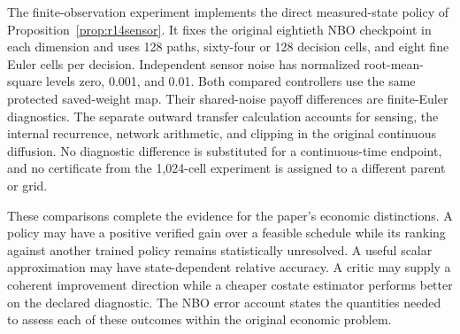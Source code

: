 


The finite-observation experiment implements the direct measured-state policy of Proposition~\ref{prop:r14sensor}. It fixes the original eightieth NBO checkpoint in each dimension and uses 128 paths, sixty-four or 128 decision cells, and eight fine Euler cells per decision. Independent sensor noise has normalized root-mean-square levels zero, 0.001, and 0.01. Both compared controllers use the same protected saved-weight map. Their shared-noise payoff differences are finite-Euler diagnostics. The separate outward transfer calculation accounts for sensing, the internal recurrence, network arithmetic, and clipping in the original continuous diffusion. No diagnostic difference is substituted for a continuous-time endpoint, and no certificate from the 1,024-cell experiment is assigned to a different parent or grid.

These comparisons complete the evidence for the paper's economic distinctions. A policy may have a positive verified gain over a feasible schedule while its ranking against another trained policy remains statistically unresolved. A useful scalar approximation may have state-dependent relative accuracy. A critic may supply a coherent improvement direction while a cheaper costate estimator performs better on the declared diagnostic. The NBO error account states the quantities needed to assess each of these outcomes within the original economic problem.

